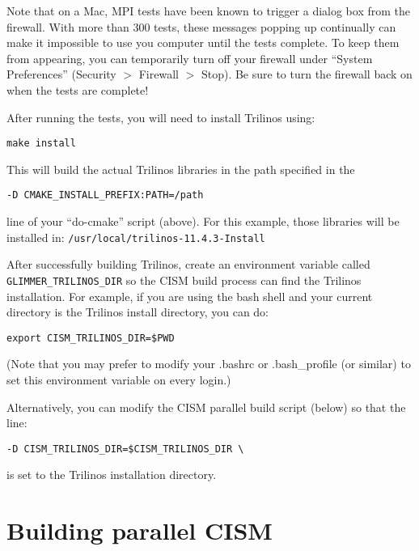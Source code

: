 \begin{mdframed}[style=mac] %
Note that on a Mac, MPI tests have been known to trigger a dialog box from the firewall. 
With more than 300 tests, these messages popping up continually can make it impossible 
to use you computer until the tests complete. To keep them from appearing, you can temporarily 
turn off your firewall under ``System Preferences'' (Security $>$ Firewall $>$ Stop). 
Be sure to turn the firewall back on when the tests are complete!
\end{mdframed}              %

After running the tests, you will need to install Trilinos using:

 \texttt{make install}

This will build the actual Trilinos libraries in the path specified in the

\begin{verbatim}
-D CMAKE_INSTALL_PREFIX:PATH=/path
\end{verbatim} 

line of your ``do-cmake'' script (above). For this example, those libraries will be 
installed in: \texttt{/usr/local/trilinos-11.4.3-Install}

After successfully building Trilinos, create an environment variable called \texttt{GLIMMER\_TRILINOS\_DIR}
so the CISM build process can find the Trilinos installation.  For example, if you 
are using the bash shell and your current directory is the Trilinos install directory, you can do:
\begin{verbatim}
export CISM_TRILINOS_DIR=$PWD
\end{verbatim}
(Note that you may prefer to modify your .bashrc or .bash\_profile (or similar)
to set this environment variable on every login.)

Alternatively, you can modify the CISM parallel build script (below) so that the line:
\begin{verbatim}
-D CISM_TRILINOS_DIR=$CISM_TRILINOS_DIR \
\end{verbatim}
is set to the Trilinos installation directory.





\section{Building parallel CISM}

